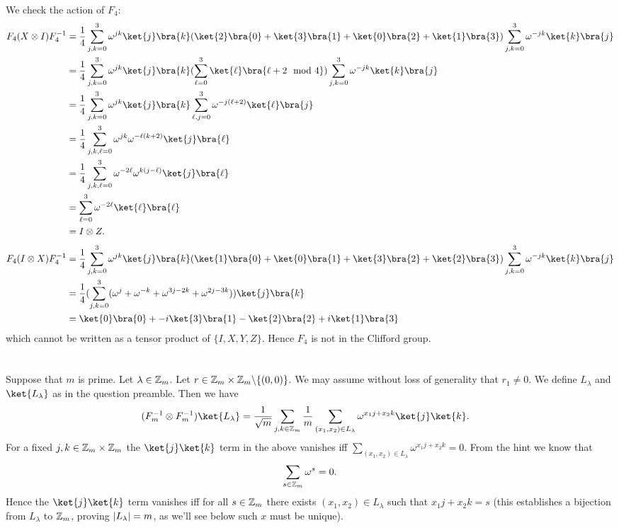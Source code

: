 \documentclass[letterpaper,12pt,oneside,onecolumn]{article}
\DeclarePairedDelimiter\abs{\lvert}{\rvert}%
\begin{document}
\paragraph{}
We check the action of $F_4$:
\begin{align*}
F_4(X\otimes I) F_4^{-1} &= \frac{1}{4} \sum_{j,k = 0}^3 \omega^{jk}\ket{j}\bra{k}(\ket{2}\bra{0} + \ket{3}\bra{1} + \ket{0}\bra{2} + \ket{1}\bra{3})\sum_{j,k = 0}^3 \omega^{-jk}\ket{k}\bra{j}\\
&= \frac{1}{4} \sum_{j,k = 0}^3 \omega^{jk}\ket{j}\bra{k}(\sum_{\ell=0}^3 \ket{\ell}\bra{\ell + 2 \mod 4})\sum_{j,k=0}^3\omega^{-jk}\ket{k}\bra{j}\\
&=  \frac{1}{4} \sum_{j,k = 0}^3 \omega^{jk}\ket{j}\bra{k}\sum_{\ell,j=0}^3 \omega^{-j(\ell+2)}\ket{\ell}\bra{j} \\
&=\frac{1}{4} \sum_{j,k,\ell=0}^3 \omega^{jk}\omega^{-\ell(k+2)}\ket{j}\bra{\ell} \\
&=\frac{1}{4} \sum_{j,k,\ell=0}^3\omega^{-2\ell} \omega^{k(j-\ell)} \ket{j}\bra{\ell}\\
&=\sum_{\ell=0}^3\omega^{-2\ell} \ket{\ell}\bra{\ell}\\
&= I \otimes Z.
\end{align*}
\begin{align*}
F_4(I\otimes X) F_4^{-1} &= \frac{1}{4} \sum_{j,k = 0}^3 \omega^{jk}\ket{j}\bra{k}(\ket{1}\bra{0} + \ket{0}\bra{1} + \ket{3}\bra{2} +\ket{2}\bra{3})\sum_{j,k = 0}^3 \omega^{-jk}\ket{k}\bra{j} \\
&= \frac{1}{4}(\sum_{j,k=0}^3(\omega^{j} + \omega^{-k} + \omega^{3j - 2k} + \omega^{2j - 3k}))\ket{j}\bra{k} \\
&= \ket{0}\bra{0} + -i\ket{3}\bra{1} - \ket{2}\bra{2} + i \ket{1}\bra{3}
\end{align*}
which cannot be written as a tensor product of $\{I, X, Y, Z\}$. Hence $F_4$ is not in the Clifford group.
\newpage\section{}
\paragraph{}
Suppose that $m$ is prime. Let $\lambda \in \mathbb{Z}_m$. Let $r \in \mathbb{Z}_m\times \mathbb{Z}_m \backslash \{(0,0)\}$. We may assume without loss of generality that $r_1 \neq 0$. We define $L_\lambda$ and $\ket{L_\lambda}$ as in the question preamble. Then we have
\begin{align*}
(F^{-1}_m \otimes F^{-1}_m) \ket{L_\lambda} &= \frac{1}{\sqrt{m}} \sum_{j,k \in \Z_m} \frac{1}{m} \sum_{(x_1,x_2) \in L_\lambda}\omega^{x_1j + x_2k}\ket{j}\ket{k}.
\end{align*}
For a fixed $j,k \in \mathbb{Z}_m\times \mathbb{Z}_m$ the $\ket{j}\ket{k}$ term in the above vanishes iff $\sum_{(x_1,x_2) \in L_\lambda}\omega^{x_1j + x_2k} = 0$.  From the hint we know that $$\sum_{s \in \mathbb{Z}_m} \omega^s = 0.$$
Hence the $\ket{j}\ket{k}$ term vanishes iff for all $s \in \mathbb{Z}_m$ there exists $(x_1,x_2) \in L_\lambda$ such that $x_1j + x_2k = s$ (this establishes a bijection from $L_\lambda$ to $\mathbb{Z}_m$, proving $\abs{L_\lambda} = m$, as we'll see below such $x$ must be unique).
\end{document}
